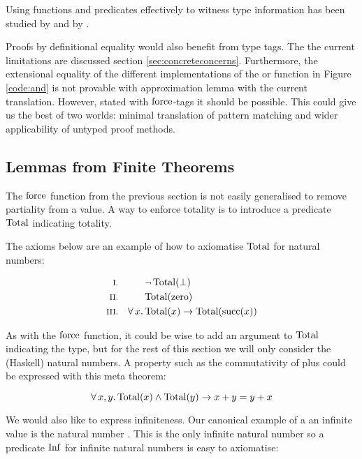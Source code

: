 Using functions and predicates effectively to witness type information
has been studied by \cite{sortMonotonicity} and by
\cite{polyMonotonicity}.

Proofs by definitional equality would also benefit from type tags. The
the current limitations are discussed section
\ref{sec:concreteconcerns}. Furthermore, the extensional equality of
the different implementations of the or function in Figure
\ref{code:and} is not provable with approximation lemma with the
current translation. However, stated with $\mathrm{force}$-tags it should
be possible. This could give us the best of two worlds: minimal
translation of pattern matching and wider applicability of untyped
proof methods.

\subsection{Lemmas from Finite Theorems}
\label{sec:total}

\newcommand\Inf{\fn{Inf}}
\newcommand\Total{\fn{Total}}
\newcommand\Fin{\fn{Fin}}
The $\mathrm{force}$ function from the previous section is not easily
generalised to remove partiality from a value. A way to enforce
totality is to introduce a predicate $\Total$ indicating totality.

The axioms below are an example of how to axiomatise $\Total$ for
natural numbers:

\begin{align*}
\rom{1} &&        & \neg \, \Total(\bot) \\
\rom{2} &&        & \Total(\fn{zero}) \\
\rom{3} && \fa{x} & \Total(x) \rightarrow \Total(\fn{succ}(x))
\end{align*}

As with the $\mathrm{force}$ function, it could be wise to add an argument
to $\Total$ indicating the type, but for the rest of this section we
will only consider the (Haskell) natural numbers. A property such as the
commutativity of plus could be expressed with this meta theorem:

\begin{equation*}
\faa{x}{y} \Total(x) \wedge \Total(y) \rightarrow x + y = y + x
\end{equation*}

We would also like to express infiniteness. Our canonical example of a
an infinite value is the natural number . This is
the only infinite natural number so a predicate $\Inf$ for infinite
natural numbers is easy to axiomatise:


